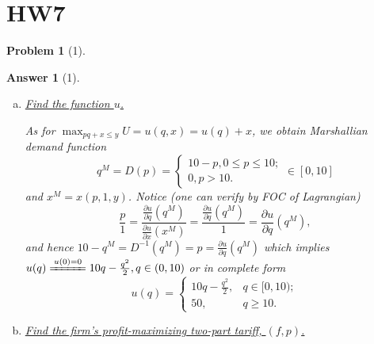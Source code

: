 \documentclass{article}
\newtheorem*{ans}{Answer}
\newtheorem*{prob}{{\bf Problem}}
\newcommand{\1}{{\bf 1}}
\newcommand{\0}{{\mathbf{0}}}
\newcommand{\<}{\langle}
\renewcommand{\>}{\rangle}
\newcommand{\dps}{\displaystyle}
\begin{document}
\section{HW7}

\begin{prob}[1]
\end{prob}
\begin{ans}[1]	\begin{enumerate}[(a)]
		\item \ul{Find the function $u$.}
		
		As for $\dps \max_{pq+x \le y}U=u(q,x) =  u(q)+ x$, we obtain Marshallian demand function \begin{equation}q^M = D(p ) =\left\{ \begin{array}{cc}
	10-p, 0\le p \le 10; \\ 0, p >10.	\end{array} \right. \in [0,10]\label{eq:Marshallian demand q}
	\end{equation} and $x^M = x(p,1,y)$.  Notice (one can verify by FOC of Lagrangian)
		$$\frac{p}{1} = \frac{\frac{\partial u }{\partial q} \left( q^M\right)}{\frac{\partial u }{\partial x} \left( x^M\right)} = \frac{\frac{\partial u }{\partial q} \left( q^M\right)}{1} = \frac{\partial u }{\partial q} \left( q^M\right) , $$
		and hence $10 - q^M= D^{-1}\left( q^M\right) = p = \frac{\partial u }{\partial q} \left( q^M\right) $ which implies $u(q)\xlongequal{u(0) = 0} 10q -\frac{q^2}2,  q\in (0,10)$ or in complete form
		\begin{equation}
		u(q) = \left\{ \begin{array}{cc} 10 q - \frac{q^2}2, & q \in [0,10);\\ 50,  & q \ge 10. \label{eq:Q1 utility function}
		\end{array} \right.
		\end{equation}
		\item \ul{ Find the firm's profit-maximizing two-part tariff, $(f,p)$.} 
		

\end{enumerate}
\end{ans}
\end{document}
